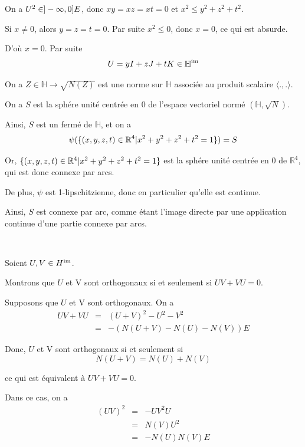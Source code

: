 On a $  U^2 \in] - \infty, 0] E$, donc $x y = x z = x t =
0$ et $x^2 \leqslant y^2 + z^2 + t^2$.

Si $x \neq 0$, alors $y = z = t = 0$. Par suite $x^2 \leqslant 0$, donc $x =
0$, ce qui est absurde.

D'o{\`u} $x = 0$. Par suite
\[ U = y I + z J + t K \in \mathbb{H}^{\operatorname{im}} \]


 On a $Z \in \mathbb{H} \rightarrow \sqrt{N (Z)}$ est une norme
sur $\mathbb{H}$ associ{\'e}e au produit scalaire $\langle ., . \rangle$.

On a $S$ est la sph{\'e}re unit{\'e} centr{\'e}e en $0$ de l'espace vectoriel
norm{\'e} $\left( \mathbb{H}, \sqrt{N} \right)$.

Ainsi, $S$ est un ferm{\'e} de $\mathbb{H}$, et on a
\[ \psi (\{ (x, y, z, t) \in \mathbb{R}^4 | x^2 + y^2 + z^2 + t^2 = 1
    \}) = S \]


Or, $\{ (x, y, z, t) \in \mathbb{R}^4 | x^2 + y^2 + z^2 + t^2 = 1 
\}$ est la sph{\'e}re unit{\'e} centr{\'e}e en 0 de $\mathbb{R}^4$, qui est
donc connexe par arcs.

De plus, $\psi$ est 1-lipschitzienne, donc en particulier qu'elle est
continue.

Ainsi, $S$ est connexe par arc, comme {\'e}tant l'image directe par une
application continue d'une partie connexe par arcs.

\

 Soient $U, V \in H^{\operatorname{im}}$.

 Montrons que $U$ et V sont orthogonaux si et seulement si $U V
+ V U = 0$.

Supposons que $U$ et V sont orthogonaux. On a
\begin{eqnarray*}
  U V + V U & = & (U + V)^2 - U^2 - V^2\\
  & = & - (N (U + V) - N (U) - N (V)) E
\end{eqnarray*}


Donc, $U$ et V sont orthogonaux si et seulement si
\[ N (U + V) = N (U) + N (V) \]


ce qui est {\'e}quivalent {\`a} $U V + V U = 0$.

Dans ce cas, on a
\begin{eqnarray*}
  (U V)^2 & = & - U V^2 U\\
  & = & N (V) U^2\\
  & = & - N (U) N (V) E
\end{eqnarray*}


